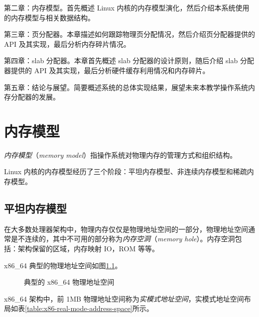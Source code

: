 \documentclass[AutoFakeBold]{LZUThesis}
\begin{document}
\begin{sloppypar}
第二章：内存模型。首先概述 Linux 内核的内存模型演化，然后介绍本系统使用的内存模型与相关数据结构。

第三章：页分配器。本章描述如何跟踪物理页分配情况，然后介绍页分配器提供的
API 及其实现，最后分析内存碎片情况。

第四章：slab 分配器。本章首先概述 slab 分配器的设计原则，随后介绍 slab
分配器提供的 API 及其实现，最后分析硬件缓存利用情况和内存碎片。

第五章：结论与展望。简要概述系统的总体实现结果，展望未来本教学操作系统内存分配器的发展。



\chapter{内存模型}

\emph{内存模型}（\emph{memory
model}）指操作系统对物理内存的管理方式和组织结构。

Linux
内核的内存模型经历了三个阶段：平坦内存模型、非连续内存模型和稀疏内存模型。


\section{平坦内存模型}

在大多数处理器架构中，物理内存仅仅是物理地址空间的一部分，物理地址空间通常是不连续的，其中不可用的部分称为\emph{内存空洞}（\emph{memory
hole}）。内存空洞包括：架构保留的区域，内存映射 IO，ROM 等等。

x86\_64 典型的物理地址空间如图\ref{figure:x86_64-physical-address-space}。

\begin{figure}[htb]
\centering

\caption{典型的 x86\_64 物理地址空间}
\label{figure:x86_64-physical-address-space}
\end{figure}

x86\_64 架构中，前 1MB
物理地址空间称为\emph{实模式地址空间}，实模式地址空间布局如表\ref{table:x86-real-mode-address-space}所示。


\end{sloppypar}
\end{document}
